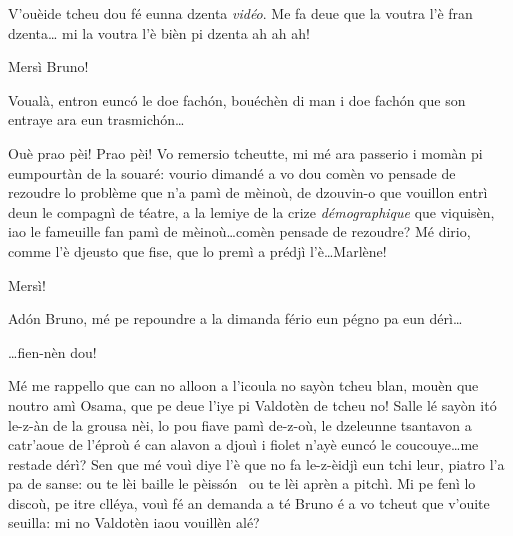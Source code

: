 \begin{drama}


\Brunospeaks {} V'ouèide tcheu dou fé eunna dzenta \textit{vidéo}.  Me fa deue que la voutra l'è fran dzenta\ldots {} mi la voutra l'è bièn pi dzenta ah ah ah!

\Presidanspeaks Mersì Bruno!

\Brunospeaks {} Voualà, entron eun\-c\'o le doe fach\'on,  bouéchèn di man i doe fach\'on que son entraye ara eun trasmich\'on\ldots


\Brunospeaks Ouè prao pèi! Prao pèi! Vo remersio tcheutte, mi mé ara passerio i momàn pi eumpourtàn de la souaré: vourio dimandé a vo dou comèn vo pensade de rezoudre lo problème que n'a pamì de mèinoù, de dzouvin-o que vouillon entrì deun le compagnì de téatre, a la lemiye de la crize \textit{démographique} que viquisèn, iao le fameuille fan pamì de mèinoù\ldots comèn pensade de rezoudre? Mé dirio, comme l'è djeusto que fise, que lo premì a prédjì  l'è\ldots Marlène!

\Presidanspeaks Mersì!


\Presidanspeaks Ad\'on Bruno, mé pe repoundre a la dimanda fério eun pégno pa eun dérì\ldots

\Brunospeaks \ldots fien-nèn dou!


\Presidanspeaks Mé me rappello que can no alloon a l’icoula no sayòn tcheu blan, mouèn que noutro amì Osama, que pe deue l'iye pi Valdotèn de tcheu no! Salle lé sayòn it\'o le-z-àn de la grousa nèi, lo pou fiave pamì de-z-où\ou , le dzeleunne tsantavon a catr'aoue de l'éproù é can alavon a djouì i fiolet n'ayè eunc\'o le coucouye\ldots me restade dérì? Sen que mé vouì diye l'è que no fa le-z-èidjì eun tchi leur, piatro l'a pa de sanse: ou te lèi baille le pèiss\'on \pesce\ ou te lèi aprèn a pitchì. Mi pe fenì lo discoù, pe itre clléya, vouì fé an demanda a té Bruno é a vo tcheut que v'ouite seuilla: mi no Valdotèn iaou vouillèn alé?


\end{drama}
